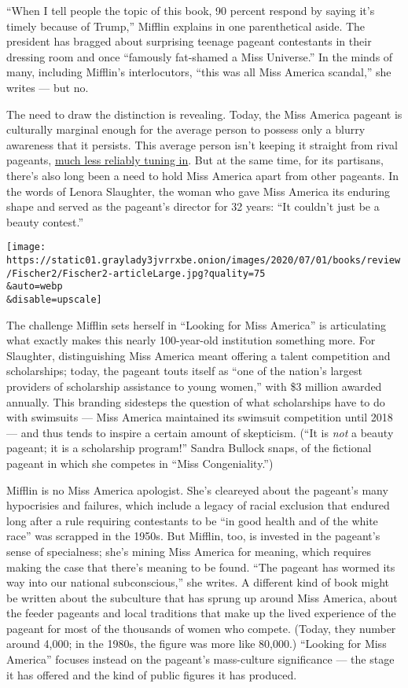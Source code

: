 ``When I tell people the topic of this book, 90 percent respond by
saying it's timely because of Trump,'' Mifflin explains in one
parenthetical aside. The president has bragged about surprising teenage
pageant contestants in their dressing room and once ``famously
fat-shamed a Miss Universe.'' In the minds of many, including Mifflin's
interlocutors, ``this was all Miss America scandal,'' she writes --- but
no.

The need to draw the distinction is revealing. Today, the Miss America
pageant is culturally marginal enough for the average person to possess
only a blurry awareness that it persists. This average person isn't
keeping it straight from rival pageants,
\href{https://www.hollywoodreporter.com/live-feed/miss-america-2020-tv-ratings-thursday-dec-19-2019-1264411\#:~:text=For\%20the\%20second\%20straight\%20year,rating\%20in\%20adults\%2018\%2D49.}{much
less reliably tuning in}. But at the same time, for its partisans,
there's also long been a need to hold Miss America apart from other
pageants. In the words of Lenora Slaughter, the woman who gave Miss
America its enduring shape and served as the pageant's director for 32
years: ``It couldn't just be a beauty contest.''

\texttt{[image: https://static01.graylady3jvrrxbe.onion/images/2020/07/01/books/review/Fischer2/Fischer2-articleLarge.jpg?quality=75\\\&auto=webp\\\&disable=upscale]}

The challenge Mifflin sets herself in ``Looking for Miss America'' is
articulating what exactly makes this nearly 100-year-old institution
something more. For Slaughter, distinguishing Miss America meant
offering a talent competition and scholarships; today, the pageant touts
itself as ``one of the nation's largest providers of scholarship
assistance to young women,'' with \$3 million awarded annually. This
branding sidesteps the question of what scholarships have to do with
swimsuits --- Miss America maintained its swimsuit competition until
2018 --- and thus tends to inspire a certain amount of skepticism. (``It
is \emph{not} a beauty pageant; it is a scholarship program!'' Sandra
Bullock snaps, of the fictional pageant in which she competes in ``Miss
Congeniality.'')

Mifflin is no Miss America apologist. She's cleareyed about the
pageant's many hypocrisies and failures, which include a legacy of
racial exclusion that endured long after a rule requiring contestants to
be ``in good health and of the white race'' was scrapped in the 1950s.
But Mifflin, too, is invested in the pageant's sense of specialness;
she's mining Miss America for meaning, which requires making the case
that there's meaning to be found. ``The pageant has wormed its way into
our national subconscious,'' she writes. A different kind of book might
be written about the subculture that has sprung up around Miss America,
about the feeder pageants and local traditions that make up the lived
experience of the pageant for most of the thousands of women who
compete. (Today, they number around 4,000; in the 1980s, the figure was
more like 80,000.) ``Looking for Miss America'' focuses instead on the
pageant's mass-culture significance --- the stage it has offered and the
kind of public figures it has produced.

